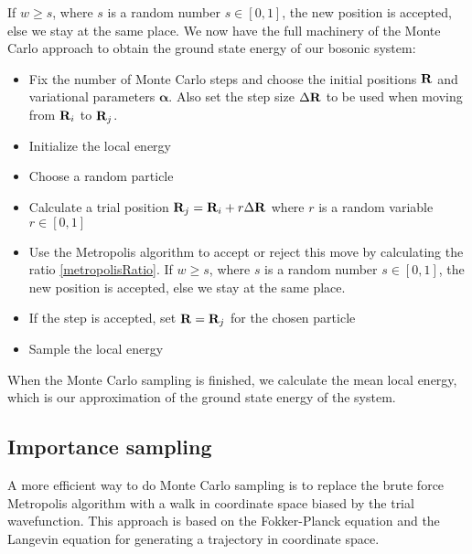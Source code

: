 \documentclass[english, a4paper]{article}
\begin{document}
If $w \geq s$, where $s$ is a random number $s \in [0,1]$, the new position is accepted, else we stay
at the same place.
We now have the full machinery of the Monte Carlo approach to obtain the ground state energy of our bosonic system:
\begin{itemize}
 \item Fix the number of Monte Carlo steps and choose the initial positions ${\bf R}$
       and variational parameters $\boldsymbol{\alpha}$.
       Also set the step size $\Delta {\bf R}$ to be used when moving from ${\bf R}_i$ to ${\bf R}_j$.
 \item Initialize the local energy
 \item Choose a random particle
 \item Calculate a trial position ${\bf R}_j = {\bf R}_i + r  \Delta {\bf R}$ where $r$ is a random variable
       $r \in [0,1]$
 \item Use the Metropolis algorithm to accept or reject this move by calculating the ratio 
       \eqref{metropolisRatio}. 
       If $w \geq s$, where $s$ is a random number $s \in [0,1]$, the new position is accepted, else we stay
       at the same place.
 \item If the step is accepted, set ${\bf R} = {\bf R}_j$ for the chosen particle
 \item Sample the local energy
\end{itemize}
When the Monte Carlo sampling is finished, we calculate the mean local energy, which is our approximation
of the ground state energy of the system.


\subsection{Importance sampling}

A more efficient way to do Monte Carlo sampling is to replace the brute force Metropolis algorithm
with a walk in coordinate space biased by the trial wavefunction. This approach is based on the 
Fokker-Planck equation and the Langevin equation for generating a trajectory in coordinate space. \\
\end{document}
